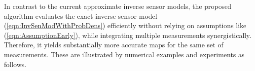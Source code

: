 \documentclass[letterpaper, 10pt, conference]{ieeeconf}
\newcommand{\refeqn}[1]{(\ref{eqn:#1})}
\begin{document}
In contrast to the current approximate inverse sensor models, the proposed algorithm evaluates the exact inverse sensor model \refeqn{InvSenModWithProbDens} efficiently without relying on assumptions like \refeqn{AssumptionEarly}, while integrating multiple measurements synergistically. Therefore, it yields substantially more accurate maps for the same set of measurements. These are illustrated by numerical examples and experiments as follows.









\end{document}
